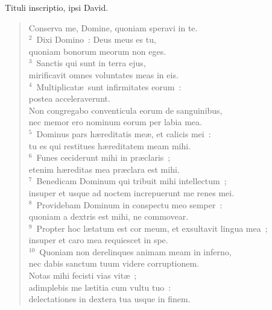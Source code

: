 \bchapter
\lettrine[lines=3,image=true,loversize=0.05,lraise=-0.03]{T}{}ituli inscriptio, ipsi David. \begin{flushleft}\begin{verse}\vspace{6pt}Conserva me, Domine, quoniam speravi in te.\\
${}^{2}$~Dixi Domino~: Deus meus es tu,\\ quoniam bonorum meorum non eges.\\
${}^{3}$~Sanctis qui sunt in terra ejus,\\ mirificavit omnes voluntates meas in eis.\\
${}^{4}$~Multiplicat\ae\ sunt infirmitates eorum~:\\ postea acceleraverunt.\\ Non congregabo conventicula eorum de sanguinibus,\\ nec memor ero nominum eorum per labia mea.\\
${}^{5}$~Dominus pars h\ae reditatis me\ae , et calicis mei~:\\ tu es qui restitues h\ae reditatem meam mihi.\\
${}^{6}$~Funes ceciderunt mihi in pr\ae claris~;\\ etenim h\ae reditas mea pr\ae clara est mihi.\\
${}^{7}$~Benedicam Dominum qui tribuit mihi intellectum~;\\ insuper et usque ad noctem increpuerunt me renes mei.\\
${}^{8}$~Providebam Dominum in conspectu meo semper~:\\ quoniam a dextris est mihi, ne commovear.\\
${}^{9}$~Propter hoc l\ae tatum est cor meum, et exsultavit lingua mea~;\\ insuper et caro mea requiescet in spe.\\
${}^{10}$~Quoniam non derelinques animam meam in inferno,\\ nec dabis sanctum tuum videre corruptionem.\\ Notas mihi fecisti vias vit\ae~;\\ adimplebis me l\ae titia cum vultu tuo~:\\ delectationes in dextera tua usque in finem.\end{verse}\end{flushleft}



